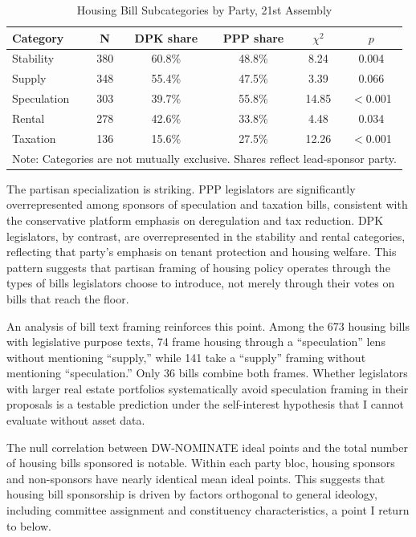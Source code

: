 \documentclass[11pt]{article}
\begin{document}
\begin{table}[H]
\centering
\caption{Housing Bill Subcategories by Party, 21st Assembly}
\label{tab:subcat}
\begin{tabular}{lccccc}
\toprule
Category & N & DPK share & PPP share & $\chi^2$ & $p$ \\
\midrule
Stability    & 380 & 60.8\% & 48.8\% & 8.24  & 0.004 \\
Supply       & 348 & 55.4\% & 47.5\% & 3.39  & 0.066 \\
Speculation  & 303 & 39.7\% & 55.8\% & 14.85 & $<$0.001 \\
Rental       & 278 & 42.6\% & 33.8\% & 4.48  & 0.034 \\
Taxation     & 136 & 15.6\% & 27.5\% & 12.26 & $<$0.001 \\
\bottomrule
\multicolumn{6}{l}{\footnotesize Note: Categories are not mutually exclusive. Shares reflect lead-sponsor party.}
\end{tabular}
\end{table}

The partisan specialization is striking. PPP legislators are significantly overrepresented among sponsors of speculation and taxation bills, consistent with the conservative platform emphasis on deregulation and tax reduction. DPK legislators, by contrast, are overrepresented in the stability and rental categories, reflecting that party's emphasis on tenant protection and housing welfare. This pattern suggests that partisan framing of housing policy operates through the types of bills legislators choose to introduce, not merely through their votes on bills that reach the floor.

An analysis of bill text framing reinforces this point. Among the 673 housing bills with legislative purpose texts, 74 frame housing through a ``speculation'' lens without mentioning ``supply,'' while 141 take a ``supply'' framing without mentioning ``speculation.'' Only 36 bills combine both frames. Whether legislators with larger real estate portfolios systematically avoid speculation framing in their proposals is a testable prediction under the self-interest hypothesis that I cannot evaluate without asset data.

The null correlation between DW-NOMINATE ideal points and the total number of housing bills sponsored is notable. Within each party bloc, housing sponsors and non-sponsors have nearly identical mean ideal points. This suggests that housing bill sponsorship is driven by factors orthogonal to general ideology, including committee assignment and constituency characteristics, a point I return to below.
\end{document}
